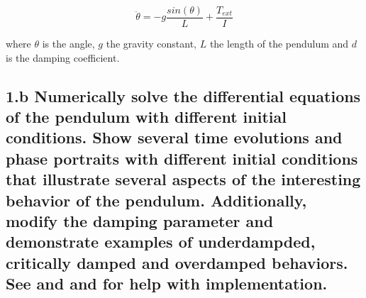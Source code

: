 \documentclass{cmc}
\begin{document}
\begin{equation}
  \label{eq:pendulum}
  \ddot{\theta} = -g\frac{sin(\theta)}{L} + \frac{T_{ext}}{I}
\end{equation}

where $\theta$ is the angle, $g$ the gravity constant, $L$ the length of the pendulum
and $d$ is the damping coefficient.








\subsection*{1.b Numerically solve the differential equations of the pendulum
  with different initial conditions.  Show several time evolutions and phase
  portraits with different initial conditions that illustrate several aspects of
  the interesting behavior of the pendulum. Additionally, modify the damping parameter
  and demonstrate examples of underdampded, critically damped and overdamped behaviors.
  See  and  and
   for help with implementation.}
\end{document}
